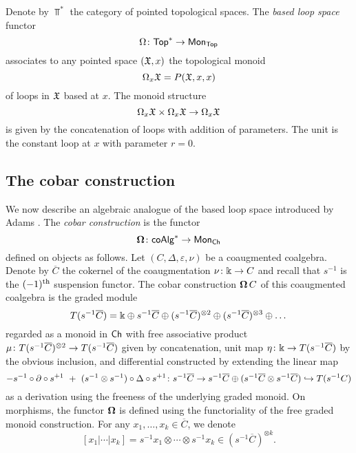 Denote by $\Top^\ast$ the category of pointed topological spaces.
The \textit{based loop space} functor
\[
\Omega \colon \mathsf{Top}^\ast \to \mathsf{Mon}_{\mathsf{Top}}
\]
associates to any pointed space $(\mathfrak{X},x)$ the topological monoid
\[
\Omega_x \mathfrak{X} = P(\mathfrak{X},x,x)
\]
of loops in $\mathfrak{X}$ based at $x$.
The monoid structure
\[
\Omega_x \mathfrak{X} \times \Omega_x \mathfrak{X} \to \Omega_x \mathfrak{X}
\]
is given by the concatenation of loops with addition of parameters.
The unit is the constant loop at $x$ with parameter $r=0$.



\subsection{The cobar construction}\label{ss:cobar construction}

We now describe an algebraic analogue of the based loop space introduced by Adams \cite{adams1956cobar}.
The \textit{cobar construction} is the functor
\[
\operatorname{\mathbf{\Omega}} \colon \mathsf{coAlg}^\ast \to \mathsf{Mon}_{\mathsf{Ch}}
\]
defined on objects as follows.
Let $(C, \Delta, \varepsilon, \nu)$ be a coaugmented coalgebra.
Denote by $\overline{C}$ the cokernel of the coaugmentation $\nu \colon \Bbbk \to C$ and recall that $s^{-1}$ is the $(-1)^{\mathrm{th}}$ suspension functor.
The cobar construction $\operatorname{\mathbf{\Omega}} C$ of this coaugmented coalgebra is the graded module
\[
T(s^{-1} \overline{C}) = \Bbbk \oplus s^{-1}\overline{C} \oplus (s^{-1}\overline{C})^{\otimes 2} \oplus (s^{-1}\overline{C})^{\otimes 3} \oplus \dots
\]
regarded as a monoid in $\mathsf{Ch}$ with free associative product $\mu \colon T(s^{-1} \overline{C})^{\otimes 2} \to T(s^{-1} \overline{C})$ given by concatenation, unit map $\eta \colon \Bbbk \to T(s^{-1} \overline{C})$ by the obvious inclusion, and differential constructed by extending the linear map
\[
- s^{-1} \circ \partial \circ s^{+1} \ + \ (s^{-1} \otimes s^{-1}) \circ \Delta \circ s^{+1} \colon
s^{-1} \overline{C} \to s^{-1}\overline{C} \oplus (s^{-1}\overline{C} \otimes s^{-1}\overline{C}) \hookrightarrow T(s^{-1}C)
\]
as a derivation using the freeness of the underlying graded monoid.
On morphisms, the functor $\operatorname{\mathbf{\Omega}}$ is defined using the functoriality of the free graded monoid construction.
For any $x_1, \dots, x_k \in \overline{C}$, we denote
\[
[x_1| \cdots | x_k]= s^{-1} x_1 \otimes \cdots \otimes s^{-1}x_k \in (s^{-1}\overline{C})^{\otimes k}.
\]


